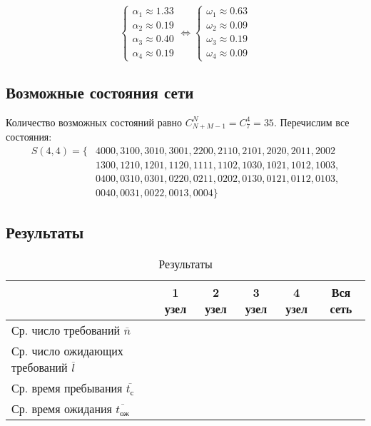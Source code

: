 \begin{displaymath}
	\begin{cases}
		\alpha_1 \approx 1.33 \\
		\alpha_2 \approx 0.19 \\
		\alpha_3 \approx 0.40 \\
		\alpha_4 \approx 0.19
	\end{cases} \Leftrightarrow \begin{cases}
		\omega_1 \approx 0.63 \\
		\omega_2 \approx 0.09 \\
		\omega_3 \approx 0.19 \\
		\omega_4 \approx 0.09
	\end{cases}
\end{displaymath}

\subsection{Возможные состояния сети}

Количество возможных состояний равно $C_{N+M-1}^{N} = C_{7}^{4} = 35$. Перечислим все состояния:
\begin{displaymath}
	\begin{split}
	S(4, 4) = \{ 
	&4000, 3100, 3010, 3001, 2200, 2110, 2101, 2020, 2011, 2002 \\ 
	&1300, 1210, 1201, 1120, 1111, 1102, 1030, 1021, 1012, 1003, \\ 
	&0400, 0310, 0301, 0220, 0211, 0202, 0130, 0121, 0112, 0103, \\ 
	&0040, 0031, 0022, 0013, 0004 \}
	\end{split}
\end{displaymath}


\subsection{Результаты}

\begin{table}[H]
	\begin{center}
		\caption{Результаты}
		\label{tab:results}
		\def\tabcolsep{8pt}
		\begin{tabular}{|C{6cm}|c|c|c|c|c|}
			\hline
			& 1 узел & 2 узел & 3 узел & 4 узел & Вся сеть \\
			\hline
			Ср. число требований $\overline{n}$ &  &  &  &  & \\
			\hline
			Ср. число ожидающих требований $\overline{l}$ &  &  &  &  & \\
			\hline
			Ср. время пребывания $\overline{t_\text{с}}$ &  &  &  &  & \\
			\hline
			Ср. время ожидания $\overline{t_\text{ож}}$ &  &  &  &  & \\
			\hline	
		\end{tabular}
	\end{center}
\end{table}

